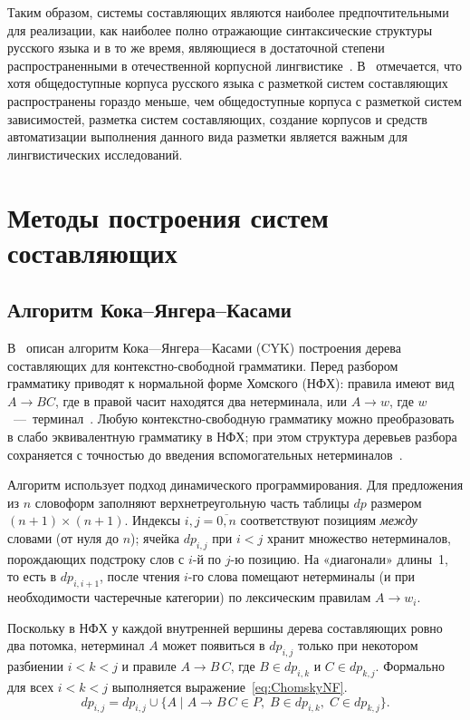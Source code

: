 Таким образом, системы составляющих являются наиболее предпочтительными для реализации, как наиболее полно отражающие синтаксические структуры русского языка и в то же время, являющиеся в достаточной степени распространенными в отечественной корпусной лингвистике~\cite{Testelets2001}. В~\cite{Grashchenkov2024RuConst,Zaharov} отмечается, что хотя общедоступные корпуса русского языка с разметкой систем составляющих распространены гораздо меньше, чем общедоступные корпуса с разметкой систем зависимостей, разметка систем составляющих, создание корпусов и средств автоматизации выполнения данного вида разметки является важным для лингвистических исследований.

\section{Методы построения систем составляющих}

\subsection{Алгоритм Кока--Янгера--Касами}

В~\cite{jurafsky2026speech} описан алгоритм Кока---Янгера---Касами (CYK) построения дерева составляющих для контекстно-свободной грамматики. Перед разбором грамматику приводят к нормальной форме Хомского (НФХ): правила имеют вид $A \to BC$, где в правой часит находятся два нетерминала, или $A \to w$, где $w$~---~терминал~\cite{jurafsky2026speech}. Любую контекстно-свободную грамматику можно преобразовать в слабо эквивалентную грамматику в НФХ; при этом структура деревьев разбора сохраняется с точностью до введения вспомогательных нетерминалов~\cite{jurafsky2026speech}.

Алгоритм использует подход динамического программирования. Для предложения из $n$ словоформ заполняют верхнетреугольную часть таблицы $dp$ размером $(n+1)\times(n+1)$. Индексы $i,j=\overline{0,n}$ соответствуют позициям \emph{между} словами (от нуля до $n$); ячейка $dp_{i,j}$ при $i<j$ хранит множество нетерминалов, порождающих подстроку слов с $i$-й по $j$-ю позицию. На «диагонали» длины~1, то есть в $dp_{i,i+1}$, после чтения $i$-го слова помещают нетерминалы (и при необходимости частеречные категории) по лексическим правилам $A \to w_i$.

Поскольку в НФХ у каждой внутренней вершины дерева составляющих ровно два потомка, нетерминал $A$ может появиться в $dp_{i,j}$ только при некотором разбиении $i<k<j$ и правиле $A \to B\,C$, где $B \in dp_{i,k}$ и $C \in dp_{k,j}$. Формально для всех $i<k<j$ выполняется выражение~\ref{eq:ChomskyNF}.
\begin{equation}
	\label{eq:ChomskyNF}
	dp_{i,j} = dp_{i,j} \cup
	\{A \mid A \to B\,C \in P,\; B \in dp_{i,k},\; C \in dp_{k,j}\}.
\end{equation}

